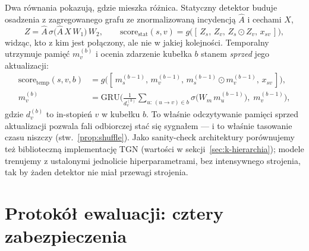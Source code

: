 Dwa równania pokazują, gdzie mieszka różnica. Statyczny detektor
buduje osadzenia z zagregowanego grafu ze znormalizowaną
incydencją $\hat A$ i cechami $X$,
\begin{equation}
Z = \hat{A}\,\sigma\!\big(\hat{A}\,X\,W_1\big)\,W_2,
\qquad
\mathrm{score}_{\mathrm{stat}}(s,v) =
g\!\big([\,Z_s,\,Z_v,\,Z_s\!\odot\!Z_v,\,x_{sv}\,]\big),
\label{eq:k-static}
\end{equation}
widząc, kto z kim jest połączony, ale nie w jakiej kolejności.
Temporalny utrzymuje pamięć $m_v^{(b)}$ i ocenia zdarzenie kubełka
$b$ stanem \emph{sprzed} jego aktualizacji:
\begin{align}
\mathrm{score}_{\mathrm{temp}}(s,v,b) &=
g\!\big([\,m_s^{(b-1)},\,m_v^{(b-1)},\,
m_s^{(b-1)}\!\odot\!m_v^{(b-1)},\,x_{sv}\,]\big),
\label{eq:k-tempscore}\\
m_v^{(b)} &= \mathrm{GRU}\!\Big(\tfrac{1}{d_v^{(b)}}
\!\!\sum_{u:\,(u\to v)\in b}\!\!
\sigma\!\big(W_m\,m_u^{(b-1)}\big),\; m_v^{(b-1)}\Big),
\label{eq:k-tempmem}
\end{align}
gdzie $d_v^{(b)}$ to in-stopień $v$ w kubełku $b$. To właśnie
odczytywanie pamięci sprzed aktualizacji pozwala fali odbiorczej
stać się sygnałem --- i to właśnie tasowanie czasu niszczy
(stw.~\ref{prop:shuffle}). Jako sanity-check architektury porównujemy
też biblioteczną implementację TGN \citep{rossi2020temporal}
(wartości w sekcji~\ref{sec:k-hierarchia}); modele trenujemy
z ustalonymi jednolicie hiperparametrami, bez intensywnego
strojenia, tak by żaden detektor nie miał przewagi strojenia.

\section{Protokół ewaluacji: cztery zabezpieczenia}
\label{sec:k-protokol}

